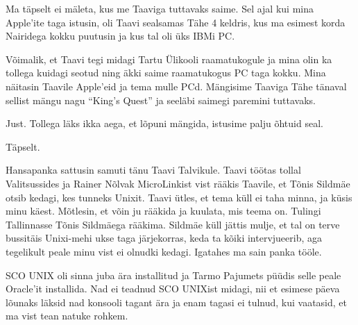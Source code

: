 
Ma täpselt ei mäleta, kus me Taaviga tuttavaks saime. 
Sel ajal kui mina Apple'ite taga istusin, oli Taavi sealsamas Tähe 
4 keldris, kus ma esimest korda Nairidega kokku puutusin ja kus tal oli üks
IBMi PC.

Võimalik, et Taavi tegi midagi Tartu Ülikooli raamatukogule ja mina olin ka tollega kuidagi seotud ning äkki saime
raamatukogus PC taga kokku. Mina näitasin Taavile Apple'eid 
ja tema mulle PCd. Mängisime Taaviga Tähe tänaval sellist mängu nagu \enquote{King's 
Quest} ja seeläbi saimegi paremini tuttavaks.


Just. Tollega läks ikka aega, et lõpuni mängida, istusime palju õhtuid 
seal.


Täpselt. 


Hansapanka sattusin samuti tänu Taavi Talvikule. 
Taavi töötas tollal Valitsussides ja 
Rainer Nõlvak MicroLinkist vist 
rääkis Taavile, et Tõnis Sildmäe otsib kedagi, kes tunneks Unixit. Taavi ütles, et tema küll ei taha 
minna, ja küsis minu käest. Mõtlesin, et võin ju rääkida ja 
kuulata, mis teema on. Tulingi Tallinnasse Tõnis Sildmäega rääkima. 
Sildmäe küll jättis mulje, et tal on terve bussitäis Unixi-mehi ukse taga 
järjekorras, keda ta kõiki intervjueerib, aga tegelikult peale minu vist
ei olnudki kedagi. Igatahes ma sain panka tööle.

SCO UNIX oli sinna juba ära installitud ja Tarmo 
Pajumets püüdis selle peale Oracle'it 
installida. Nad ei teadnud SCO UNIXist midagi, nii et esimese 
päeva lõunaks läksid nad konsooli tagant ära ja enam
tagasi ei tulnud, kui vaatasid, et ma vist tean natuke rohkem.


